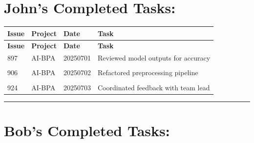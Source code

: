 \documentclass{article}
\begin{document}
\section*{\centering \textbf{ John's Completed Tasks: }}
\label{sec:john_tasks}


\begin{longtable}{@{}p{2.5cm} p{2.5cm} p{2.5cm} p{6.5cm}@{}}
\toprule
\textbf{ Issue } & \textbf{ Project } & \textbf{ Date } & \textbf{ Task } \\
\midrule
\endfirsthead

\toprule
\textbf{ Issue } & \textbf{ Project } & \textbf{ Date } & \textbf{ Task } \\
\midrule
\endhead

\bottomrule
\endfoot


897 & AI-BPA & 20250701 & Reviewed model outputs for accuracy \\

\\[-0.5ex]  %


906 & AI-BPA & 20250702 & Refactored preprocessing pipeline \\

\\[-0.5ex]  %


924 & AI-BPA & 20250703 & Coordinated feedback with team lead \\


\end{longtable}


\vspace{0.5cm}
\hrule
\vspace{1cm}


\section*{\centering \textbf{ Bob's Completed Tasks: }}
\label{sec:bob_tasks}
\end{document}
